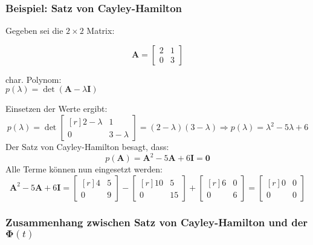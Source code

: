 \subsubsection*{Beispiel: Satz von Cayley-Hamilton}

Gegeben sei die \(2 \times 2\) Matrix:
\begin{center}
\begin{minipage}[t]{0.48\columnwidth}
    \vspace{-0.05cm}
    $$\bm{A} = \begin{bmatrix*} 2 & 1 \\ 0 & 3 \end{bmatrix*}$$
\end{minipage}
\hfill
\begin{minipage}[t]{0.48\columnwidth}
    \vspace{0cm}
    char. Polynom: \\
    \(p(\lambda) = \det(\bm{A} - \lambda \bm{I})\)
\end{minipage}
\end{center}
Einsetzen der Werte ergibt:
$$ p(\lambda) = \det\begin{bmatrix*}[r] 2 - \lambda & 1 \\ 0 & 3 - \lambda \end{bmatrix*} = (2 - \lambda)(3 - \lambda)
\Rightarrow p(\lambda) = \lambda^2 - 5\lambda + 6 $$
Der Satz von Cayley-Hamilton besagt, dass:
$$ p(\bm{A}) = \bm{A}^2 - 5\bm{A} + 6\bm{I} = \bm{0} $$
Alle Terme können nun eingesetzt werden:
$$ \bm{A}^2 - 5\bm{A} + 6\bm{I} =  \begin{bmatrix*}[r] 4 & 5 \\ 0 & 9 \end{bmatrix*} - \begin{bmatrix*}[r] 10 & 5 \\ 0 & 15 \end{bmatrix*} 
+ \begin{bmatrix*}[r] 6 & 0 \\ 0 & 6 \end{bmatrix*} = \begin{bmatrix*}[r] 0 & 0 \\ 0 & 0 \end{bmatrix*} $$

\subsubsection*{Zusammenhang zwischen Satz von Cayley-Hamilton und der $\bm{\Phi}(t)$}

